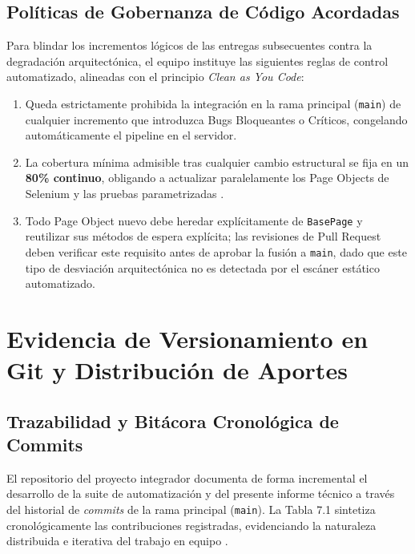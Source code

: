 \documentclass[12pt,oneside]{report}
\begin{document}
\section{Políticas de Gobernanza de Código Acordadas}

Para blindar los incrementos lógicos de las entregas subsecuentes contra la degradación arquitectónica, el equipo instituye las siguientes reglas de control automatizado, alineadas con el principio \textit{Clean as You Code}:

\begin{enumerate}
    \item Queda estrictamente prohibida la integración en la rama principal (\texttt{main}) de cualquier incremento que introduzca Bugs Bloqueantes o Críticos, congelando automáticamente el pipeline en el servidor.
    \item La cobertura mínima admisible tras cualquier cambio estructural se fija en un \textbf{80\% continuo}, obligando a actualizar paralelamente los Page Objects de Selenium y las pruebas parametrizadas \parencite{sommerville2011}.
    \item Todo Page Object nuevo debe heredar explícitamente de \texttt{BasePage} y reutilizar sus métodos de espera explícita; las revisiones de Pull Request deben verificar este requisito antes de aprobar la fusión a \texttt{main}, dado que este tipo de desviación arquitectónica no es detectada por el escáner estático automatizado.
\end{enumerate}

\chapter{Evidencia de Versionamiento en Git y Distribución de Aportes}

\section{Trazabilidad y Bitácora Cronológica de Commits}

El repositorio del proyecto integrador documenta de forma incremental el desarrollo de la suite de automatización y del presente informe técnico a través del historial de \textit{commits} de la rama principal (\texttt{main}). La Tabla 7.1 sintetiza cronológicamente las contribuciones registradas, evidenciando la naturaleza distribuida e iterativa del trabajo en equipo \parencite{sommerville2011}.
\end{document}

